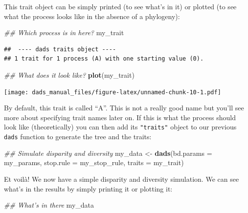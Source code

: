 \documentclass[]{book}
\newenvironment{Shaded}{\begin{snugshade}}{\end{snugshade}}
\newcommand{\CommentTok}[1]{\textcolor[rgb]{0.56,0.35,0.01}{\textit{#1}}}
\newcommand{\DataTypeTok}[1]{\textcolor[rgb]{0.13,0.29,0.53}{#1}}
\newcommand{\KeywordTok}[1]{\textcolor[rgb]{0.13,0.29,0.53}{\textbf{#1}}}
\newcommand{\NormalTok}[1]{#1}
\newcommand{\StringTok}[1]{\textcolor[rgb]{0.31,0.60,0.02}{#1}}
\begin{document}
This trait object can be simply printed (to see what's in it) or plotted (to see what the process looks like in the absence of a phylogeny):

\begin{Shaded}
\begin{Highlighting}[]
\CommentTok{## Which process is in here?}
\NormalTok{my_trait}
\end{Highlighting}
\end{Shaded}

\begin{verbatim}
##  ---- dads traits object ---- 
## 1 trait for 1 process (A) with one starting value (0).
\end{verbatim}

\begin{Shaded}
\begin{Highlighting}[]
\CommentTok{## What does it look like?}
\KeywordTok{plot}\NormalTok{(my_trait)}
\end{Highlighting}
\end{Shaded}

\texttt{[image: dads\_manual\_files/figure-latex/unnamed-chunk-10-1.pdf]}

By default, this trait is called ``A''.
This is not a really good name but you'll see more about specifying trait names later on.
If this is what the process should look like (theoretically) you can then add its \texttt{"traits"} object to our previous \texttt{dads} function to generate the tree and the traits:

\begin{Shaded}
\begin{Highlighting}[]
\CommentTok{## Simulate disparity and diversity}
\NormalTok{my_data <-}\StringTok{ }\KeywordTok{dads}\NormalTok{(}\DataTypeTok{bd.params =}\NormalTok{ my_params,}
                \DataTypeTok{stop.rule =}\NormalTok{ my_stop_rule,}
                \DataTypeTok{traits    =}\NormalTok{ my_trait)}
\end{Highlighting}
\end{Shaded}

Et voilà! We now have a simple disparity and diversity simulation.
We can see what's in the results by simply printing it or plotting it:

\begin{Shaded}
\begin{Highlighting}[]
\CommentTok{## What's in there}
\NormalTok{my_data}
\end{Highlighting}
\end{Shaded}
\end{document}
